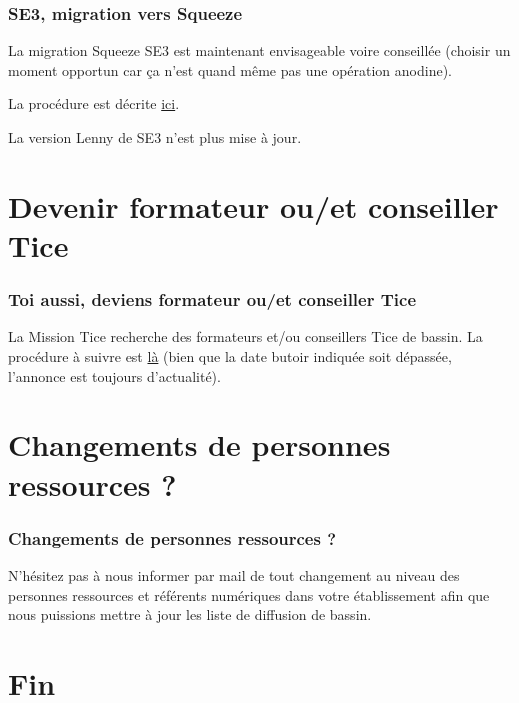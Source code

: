 \documentclass[french]{beamer}
\begin{document}
\begin{frame}%
\frametitle{SE3, migration vers Squeeze}

La migration Squeeze SE3 est maintenant envisageable voire conseillée
(choisir un moment opportun car ça n'est quand même pas une opération anodine).

La procédure est décrite \href{http://wwdeb.crdp.ac-caen.fr/mediase3/index.php/Faqlenny2squeeze}{ici}.

La version Lenny de SE3 n'est plus mise à jour.

\end{frame}



\section[La Mission Tice recrute]{Devenir formateur ou/et conseiller Tice}

\begin{frame}%
\frametitle{Toi aussi, deviens formateur ou/et conseiller Tice}

La Mission Tice recherche des formateurs et/ou conseillers Tice de bassin.
La procédure à suivre est \href{http://www.tice.ac-versailles.fr/Recrutement-2013}{là}
(bien que la date butoir indiquée soit dépassée, l'annonce est toujours d'actualité).

\end{frame}



\section[Changements de PR]{Changements de personnes ressources ?}


\begin{frame}%
\frametitle{Changements de personnes ressources ?}

N'hésitez pas à \alert{nous informer par mail de tout changement au
niveau des personnes ressources et référents numériques} dans
votre établissement afin que nous puissions mettre à jour les
liste de diffusion de bassin.




\end{frame}



\section{Fin}
\end{document}
